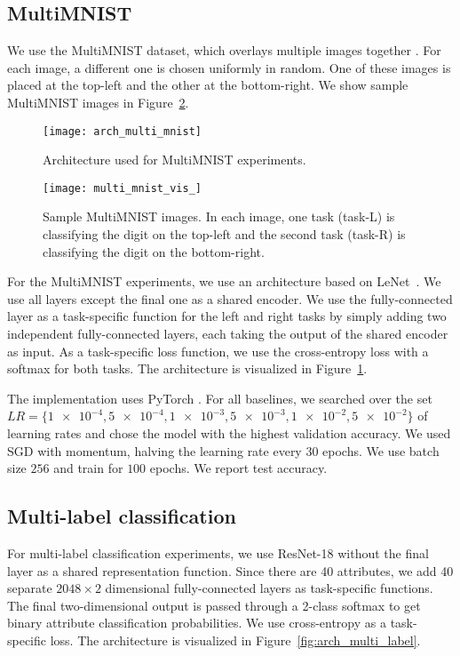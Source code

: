 
\subsection{MultiMNIST}
We use the MultiMNIST dataset, which overlays multiple images together \citep{multi_mnist}. For each image, a different one is chosen uniformly in random. One of these images is placed at the top-left and the other at the bottom-right. We show sample MultiMNIST images in Figure~\ref{fig:sample_multi_mnist}.

\begin{figure}[ht]
\texttt{[image: arch\_multi\_mnist]}
\caption{Architecture used for MultiMNIST experiments.}
\label{fig:multi_mnist}
\end{figure}

\begin{figure}[hb]
\texttt{[image: multi\_mnist\_vis\_]}
\caption{Sample MultiMNIST images. In each image, one task (task-L) is classifying the digit on the top-left and the second task (task-R) is classifying the digit on the bottom-right.}
\label{fig:sample_multi_mnist}
\end{figure}

For the MultiMNIST experiments, we use an architecture based on LeNet~\citep{mnist}. We use all layers except the final one as a shared encoder. We use the fully-connected layer as a task-specific function for the left and right tasks by simply adding two independent fully-connected layers, each taking the output of the shared encoder as input. As a task-specific loss function, we use the cross-entropy loss with a softmax for both tasks. The architecture is visualized in Figure~\ref{fig:multi_mnist}.

The implementation uses PyTorch \citep{pytorch}. For all baselines, we searched over the set $LR=\{\num{1e-4}, \num{5e-4}, \num{1e-3}, \num{5e-3}, \num{1e-2}, \num{5e-2}\}$ of learning rates and chose the model with the highest validation accuracy. We used SGD with momentum, halving the learning rate every 30 epochs. We use batch size $256$ and train for $100$ epochs. We report test accuracy.

\subsection{Multi-label classification}
For multi-label classification experiments, we use ResNet-18 \citep{resnet} without the final layer as a shared representation function. Since there are 40 attributes, we add 40 separate $2048\times2$ dimensional fully-connected layers as task-specific functions. The final two-dimensional output is passed through a 2-class softmax to get binary attribute classification probabilities. We use cross-entropy as a task-specific loss. The architecture is visualized in Figure~\ref{fig:arch_multi_label}.

